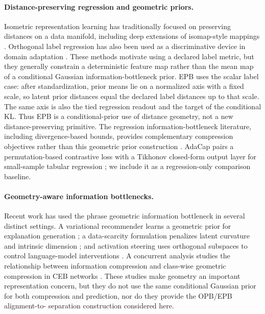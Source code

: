 \paragraph{Distance-preserving regression and geometric priors.}
Isometric representation learning has traditionally focused on preserving distances
on a data manifold, including deep extensions of isomap-style mappings
\citep{pai2022isometric}. Orthogonal label regression has also been used as a
discriminative device in domain adaptation \citep{luo2023doll}. These methods motivate
using a declared label metric, but they generally constrain a deterministic feature
map rather than the mean map of a conditional Gaussian information-bottleneck prior.
EPB uses the scalar label case: after standardization, prior means lie on a normalized
axis with a fixed scale, so latent prior distances equal the declared label distances
up to that scale. The same axis is also the tied regression readout and the target of
the conditional KL. Thus EPB is a conditional-prior use of distance geometry, not a
new distance-preserving primitive. The
regression information-bottleneck literature, including divergence-based bounds,
provides complementary compression objectives rather than this geometric prior
construction \citep{yu2024csd_ib}. AdaCap pairs a permutation-based contrastive
loss with a Tikhonov closed-form output layer for small-sample tabular regression
\citep{belucci2026adacap}; we include it as a regression-only comparison baseline.

\paragraph{Geometry-aware information bottlenecks.}
Recent work has used the phrase geometric information bottleneck in several distinct
settings. A variational recommender learns a geometric prior for explanation
generation \citep{yan2024geometric_ib}; a data-scarcity formulation penalizes latent
curvature and intrinsic dimension \citep{katende2025vgib}; and activation steering
uses orthogonal subspaces to control language-model interventions
\citep{doan2026geometric_ib}. A concurrent analysis studies the relationship between
information compression and class-wise geometric compression in CEB networks
\citep{adilova2026geometric_compression}. These studies make geometry an important
representation concern, but they do not use the same conditional Gaussian prior for
both compression and prediction, nor do they provide the OPB/EPB alignment-to-
separation construction considered here.
